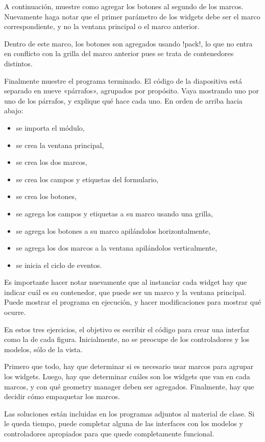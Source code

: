 \documentclass[10pt]{article}
\begin{document}

  A continuación,
  muestre como agregar los botones
  al segundo de los marcos.
  Nuevamente haga notar que el primer parámetro de los widgets
  debe ser el marco correspondiente,
  y no la ventana principal o el marco anterior.

  Dentro de este marco,
  los botones son agregados usando \li!pack!,
  lo que no entra en conflicto con la grilla del marco anterior
  pues se trata de contenedores distintos.


  Finalmente muestre el programa terminado.
  El código de la diapositiva está separado
  en nueve «párrafos», agrupados por propósito.
  Vaya mostrando uno por uno de los párrafos,
  y explique qué hace cada uno.
  En orden de arriba hacia abajo:
  \begin{itemize}
    \item se importa el módulo,
    \item se crea la ventana principal,
    \item se crea los dos marcos,
    \item se crea los campos y etiquetas del formulario,
    \item se crea los botones,
    \item se agrega los campos y etiquetas a su marco usando una grilla,
    \item se agrega los botones a su marco apilándolos horizontalmente,
    \item se agrega los dos marcos a la ventana apilándolos verticalmente,
    \item se inicia el ciclo de eventos.
  \end{itemize}

  Es importante hacer notar nuevamente
  que al instanciar cada widget
  hay que indicar cuál es su contenedor,
  que puede ser un marco y la ventana principal.
  Puede mostrar el programa en ejecución,
  y hacer modificaciones para mostrar qué ocurre.


  En estos tres ejercicios,
  el objetivo es escribir el código
  para crear una interfaz como la de cada figura.
  Inicialmente,
  no se preocupe de los controladores y los modelos,
  sólo de la vista.

  Primero que todo,
  hay que determinar si es necesario usar marcos
  para agrupar los widgets.
  Luego, hay que determinar cuáles son los widgets que van en cada marcos,
  y con qué geometry manager deben ser agregados.
  Finalmente,
  hay que decidir cómo empaquetar los marcos.

  Las soluciones están incluidas
  en los programas adjuntos al material de clase.
  Si le queda tiempo,
  puede completar alguna de las interfaces
  con los modelos y controladores apropiados
  para que quede completamente funcional.
\end{document}
